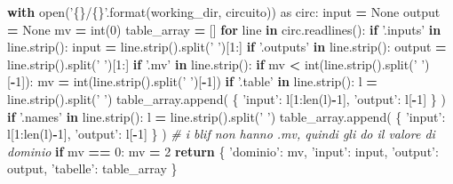 \documentclass[]{book}
\newenvironment{Shaded}{\begin{snugshade}}{\end{snugshade}}
\newcommand{\BuiltInTok}[1]{#1}
\newcommand{\CommentTok}[1]{\textcolor[rgb]{0.56,0.35,0.01}{\textit{#1}}}
\newcommand{\ControlFlowTok}[1]{\textcolor[rgb]{0.13,0.29,0.53}{\textbf{#1}}}
\newcommand{\DecValTok}[1]{\textcolor[rgb]{0.00,0.00,0.81}{#1}}
\newcommand{\ImportTok}[1]{#1}
\newcommand{\KeywordTok}[1]{\textcolor[rgb]{0.13,0.29,0.53}{\textbf{#1}}}
\newcommand{\NormalTok}[1]{#1}
\newcommand{\OperatorTok}[1]{\textcolor[rgb]{0.81,0.36,0.00}{\textbf{#1}}}
\newcommand{\SpecialCharTok}[1]{\textcolor[rgb]{0.00,0.00,0.00}{#1}}
\newcommand{\StringTok}[1]{\textcolor[rgb]{0.31,0.60,0.02}{#1}}
\newcommand{\VariableTok}[1]{\textcolor[rgb]{0.00,0.00,0.00}{#1}}
\begin{document}
\begin{Shaded}
\begin{Highlighting}[]
\ControlFlowTok{with} \BuiltInTok{open}\NormalTok{(}\StringTok{'}\SpecialCharTok{\{\}}\StringTok{/}\SpecialCharTok{\{\}}\StringTok{'}\NormalTok{.}\BuiltInTok{format}\NormalTok{(working_dir, circuito)) }\ImportTok{as}\NormalTok{ circ:}
  \BuiltInTok{input} \OperatorTok{=} \VariableTok{None}
\NormalTok{  output }\OperatorTok{=} \VariableTok{None}
\NormalTok{  mv }\OperatorTok{=} \BuiltInTok{int}\NormalTok{(}\DecValTok{0}\NormalTok{)}
\NormalTok{  table_array }\OperatorTok{=}\NormalTok{ []}
  \ControlFlowTok{for}\NormalTok{ line }\KeywordTok{in}\NormalTok{ circ.readlines():}
    \ControlFlowTok{if} \StringTok{'.inputs'} \KeywordTok{in}\NormalTok{ line.strip():}
      \BuiltInTok{input} \OperatorTok{=}\NormalTok{ line.strip().split(}\StringTok{' '}\NormalTok{)[}\DecValTok{1}\NormalTok{:]}
    \ControlFlowTok{if} \StringTok{'.outputs'} \KeywordTok{in}\NormalTok{ line.strip():}
\NormalTok{      output }\OperatorTok{=}\NormalTok{ line.strip().split(}\StringTok{' '}\NormalTok{)[}\DecValTok{1}\NormalTok{:]}
    \ControlFlowTok{if} \StringTok{'.mv'} \KeywordTok{in}\NormalTok{ line.strip():}
      \ControlFlowTok{if}\NormalTok{ mv }\OperatorTok{<} \BuiltInTok{int}\NormalTok{(line.strip().split(}\StringTok{' '}\NormalTok{)[}\OperatorTok{-}\DecValTok{1}\NormalTok{]):}
\NormalTok{        mv }\OperatorTok{=} \BuiltInTok{int}\NormalTok{(line.strip().split(}\StringTok{' '}\NormalTok{)[}\OperatorTok{-}\DecValTok{1}\NormalTok{])}
    \ControlFlowTok{if} \StringTok{'.table'} \KeywordTok{in}\NormalTok{ line.strip():}
\NormalTok{      l }\OperatorTok{=}\NormalTok{ line.strip().split(}\StringTok{' '}\NormalTok{)}
\NormalTok{      table_array.append(}
\NormalTok{        \{}
          \StringTok{'input'}\NormalTok{:    l[}\DecValTok{1}\NormalTok{:}\BuiltInTok{len}\NormalTok{(l)}\OperatorTok{-}\DecValTok{1}\NormalTok{],}
          \StringTok{'output'}\NormalTok{:   l[}\OperatorTok{-}\DecValTok{1}\NormalTok{]}
\NormalTok{        \}}
\NormalTok{      )}
    \ControlFlowTok{if} \StringTok{'.names'} \KeywordTok{in}\NormalTok{ line.strip():}
\NormalTok{      l }\OperatorTok{=}\NormalTok{ line.strip().split(}\StringTok{' '}\NormalTok{)}
\NormalTok{      table_array.append(}
\NormalTok{        \{}
          \StringTok{'input'}\NormalTok{:    l[}\DecValTok{1}\NormalTok{:}\BuiltInTok{len}\NormalTok{(l)}\OperatorTok{-}\DecValTok{1}\NormalTok{],}
          \StringTok{'output'}\NormalTok{:   l[}\OperatorTok{-}\DecValTok{1}\NormalTok{]}
\NormalTok{        \}}
\NormalTok{      )}
  \CommentTok{# i blif non hanno .mv, quindi gli do il valore di dominio}
  \ControlFlowTok{if}\NormalTok{ mv }\OperatorTok{==} \DecValTok{0}\NormalTok{:}
\NormalTok{    mv }\OperatorTok{=} \DecValTok{2}
  \ControlFlowTok{return}\NormalTok{ \{}
    \StringTok{'dominio'}\NormalTok{:   mv,}
    \StringTok{'input'}\NormalTok{:    }\BuiltInTok{input}\NormalTok{,}
    \StringTok{'output'}\NormalTok{:   output,}
    \StringTok{'tabelle'}\NormalTok{:  table_array}
\NormalTok{  \}}
\end{Highlighting}
\end{Shaded}
\end{document}
